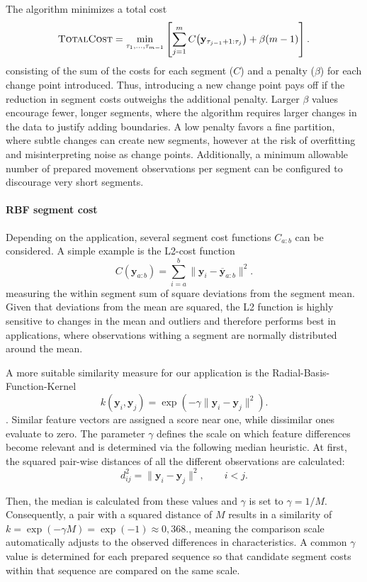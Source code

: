 The algorithm minimizes a total cost
 \[
       \textsc{TotalCost} = \min_{\tau_1,\ldots,\tau_{m-1}}
        \left[
            \sum_{j=1}^{m}
            C\!\left(
                \mathbf y_{\tau_{j-1}+1:\tau_j}
            \right)
            +\beta(m-1)
        \right].
    \]
consisting of the sum of the costs for each segment ($C$) and a penalty ($\beta$) for each change point introduced.
Thus, introducing a new change point pays off if the reduction in segment costs outweighs the additional penalty.
Larger $\beta$ values encourage fewer, longer segments, where the algorithm requires larger changes in the data to justify adding boundaries.
A low penalty favors a fine partition, where subtle changes can create new segments, however at the risk of overfitting and misinterpreting noise as change points.
Additionally, a minimum allowable number of prepared movement observations per segment can be configured to discourage very short segments.

\paragraph{RBF segment cost}
Depending on the application, several segment cost functions $C_{a:b}$ can be considered.
A simple example is the L2-cost function
\[
    C(\mathbf y_{a:b}) = \sum_{i=a}^{b}\lVert\mathbf y_i-\overline{\mathbf y}_{a:b}\rVert^2.
\]
measuring the within segment sum of square deviations from the segment mean.
Given that deviations from the mean are squared, the L2 function is highly sensitive to changes in the mean and outliers and therefore performs best in applications,
where observations withing a segment are normally distributed around the mean.

A more suitable similarity measure for our application is the Radial-Basis-Function-Kernel\[
        k(\mathbf y_i,\mathbf y_j)
        =
        \exp\!\left(
            -\gamma
            \lVert\mathbf y_i-\mathbf y_j\rVert^2
        \right).
    \].
Similar feature vectors are assigned a score near one, while dissimilar ones evaluate to zero.
The parameter $\gamma$ defines the scale on which feature differences become relevant and is determined via the following median heuristic.
At first, the squared pair-wise distances of all the different observations are calculated:
\[
d_{ij}^{2}=\lVert\mathbf y_i-\mathbf y_j\rVert^2,
\qquad i<j.
\]

Then, the median is calculated from these values and $\gamma$ is set to $\gamma = 1 / M$.
Consequently, a pair with a squared distance of $M$ results in a similarity of \(
k=\exp(-\gamma M)=\exp(-1)\approx0{,}368.
\), meaning the comparison scale automatically adjusts to the observed differences in characteristics.
A common $\gamma$ value is determined for each prepared sequence so that candidate segment costs within that sequence are compared on the same scale.

